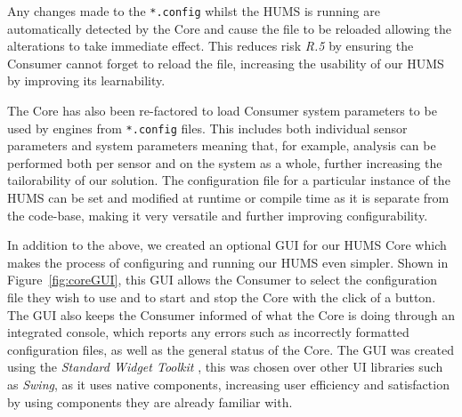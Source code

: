 \documentclass[10pt,a4paper]{article}
\begin{document}
Any changes made to the \texttt{*.config} whilst the HUMS is running are automatically detected by the Core and cause the file to be reloaded allowing the alterations to take immediate effect. This reduces risk \emph{R.5} by ensuring the Consumer cannot forget to reload the file, increasing the usability of our HUMS by improving its learnability.

The Core has also been re-factored to load Consumer system parameters to be used by engines from \texttt{*.config} files. This includes both individual sensor parameters and system parameters meaning that, for example, analysis can be performed both per sensor and on the system as a whole, further increasing the tailorability of our solution.
The configuration file for a particular instance of the HUMS can be set and modified at runtime or compile time as it is separate from the code-base, making it very versatile and further improving configurability. 

In addition to the above, we created an optional GUI for our HUMS Core which makes the process of configuring and running our HUMS even simpler. Shown in Figure~\ref{fig:coreGUI}, this GUI allows the Consumer to select the configuration file they wish to use and to start and stop the Core with the click of a button. The GUI also keeps the Consumer informed of what the Core is doing through an integrated console, which reports any errors such as incorrectly formatted configuration files, as well as the general status of the Core. The GUI was created using the \emph{Standard Widget Toolkit} \cite{swt}, this was chosen over other UI libraries such as \emph{Swing}, as it uses native components, increasing user efficiency and satisfaction by using components they are already familiar with.
\end{document}
